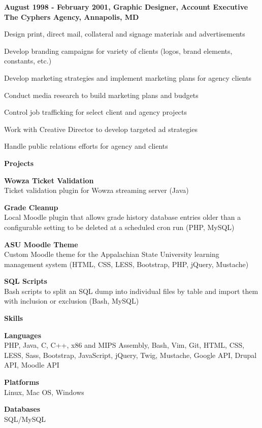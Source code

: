 \documentclass[letterpaper,10pt,final]{memoir}
\newcommand{\Sep}{\vspace{1.5em}}
\newcommand{\SmallSep}{\vspace{0.5em}}
\newcommand{\CVSection}[1]
	{\Large\textbf{#1}\par
	\SmallSep\normalsize\normalfont}
\newcommand{\CVItem}[1]
	{\textbf{\color{BrickRed} #1}}
\begin{document}
\CVItem{August 1998 - February 2001, Graphic Designer, Account Executive\\
The Cyphers Agency, Annapolis, MD}
\begin{compactitem}[\color{BrickRed}$\circ$]
	\item Design print, direct mail, collateral and signage materials and advertisements
	\item Develop branding campaigns for variety of clients (logos, brand elements, constants, etc.)
	\item Develop marketing strategies and implement marketing plans for agency clients
	\item Conduct media research to build marketing plans and budgets
	\item Control job trafficking for select client and agency projects
	\item Work with Creative Director to develop targeted ad strategies
	\item Handle public relations efforts for agency and clients
\end{compactitem}
\Sep

\CVSection{Projects}
\CVItem{Wowza Ticket Validation}\\
Ticket validation plugin for Wowza streaming server (Java)
\SmallSep

\CVItem{Grade Cleanup}\\
Local Moodle plugin that allows grade history database entries older than a configurable setting to be deleted at a scheduled cron run (PHP, MySQL)
\SmallSep

\CVItem{ASU Moodle Theme}\\
Custom Moodle theme for the Appalachian State University learning management system (HTML, CSS, LESS, Bootstrap, PHP, jQuery, Mustache)
\SmallSep

\CVItem{SQL Scripts}\\
Bash scripts to split an SQL dump into individual files by table and import them with inclusion or exclusion (Bash, MySQL)
\Sep

\CVSection{Skills}
\CVItem{Languages}\\
PHP, Java, C, C++, x86 and MIPS Assembly, Bash, Vim, Git, HTML, CSS, LESS, Sass, Bootstrap, JavaScript, jQuery, Twig, Mustache, Google API, Drupal API, Moodle API
\SmallSep

\CVItem{Platforms}\\
Linux, Mac OS, Windows
\SmallSep

\CVItem{Databases}\\
SQL/MySQL
\SmallSep
\end{document}
